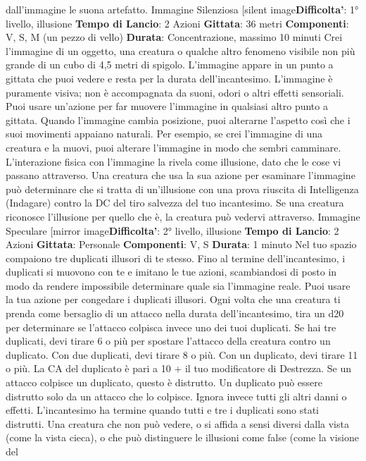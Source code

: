\begin{multicols}{2}
dall’immagine le suona artefatto.
Immagine Silenziosa
[silent image\textbf{Difficolta'}:
1° livello, illusione
\textbf{Tempo di Lancio}: 2 Azioni
\textbf{Gittata}: 36 metri
\textbf{Componenti}: V, S, M (un pezzo di vello)
\textbf{Durata}: Concentrazione, massimo 10 minuti
Crei l’immagine di un oggetto, una creatura o qualche
altro fenomeno visibile non più grande di un cubo di 4,5
metri di spigolo. L’immagine appare in un punto a
gittata che puoi vedere e resta per la durata
dell’incantesimo. L’immagine è puramente visiva; non è
accompagnata da suoni, odori o altri effetti sensoriali.
Puoi usare un’azione per far muovere l’immagine in
qualsiasi altro punto a gittata. Quando l’immagine
cambia posizione, puoi alterarne l’aspetto così che i
suoi movimenti appaiano naturali. Per esempio, se crei
l’immagine di una creatura e la muovi, puoi alterare
l’immagine in modo che sembri camminare.
L’interazione fisica con l’immagine la rivela come
illusione, dato che le cose vi passano attraverso. Una
creatura che usa la sua azione per esaminare
l’immagine può determinare che si tratta di un’illusione
con una prova riuscita di Intelligenza (Indagare) contro
la DC del tiro salvezza del tuo incantesimo. Se una
creatura riconosce l’illusione per quello che è, la
creatura può vedervi attraverso.
Immagine Speculare
[mirror image\textbf{Difficolta'}:
2° livello, illusione
\textbf{Tempo di Lancio}: 2 Azioni
\textbf{Gittata}: Personale
\textbf{Componenti}: V, S
\textbf{Durata}: 1 minuto
Nel tuo spazio compaiono tre duplicati illusori di te
stesso. Fino al termine dell’incantesimo, i duplicati si
muovono con te e imitano le tue azioni, scambiandosi di
posto in modo da rendere impossibile determinare
quale sia l’immagine reale. Puoi usare la tua azione per
congedare i duplicati illusori.
Ogni volta che una creatura ti prenda come bersaglio di
un attacco nella durata dell’incantesimo, tira un d20 per
determinare se l’attacco colpisca invece uno dei tuoi
duplicati.
Se hai tre duplicati, devi tirare 6 o più per spostare
l’attacco della creatura contro un duplicato. Con due
duplicati, devi tirare 8 o più. Con un duplicato, devi
tirare 11 o più.
La CA del duplicato è pari a 10 + il tuo modificatore di
Destrezza. Se un attacco colpisce un duplicato, questo
è distrutto. Un duplicato può essere distrutto solo da un
attacco che lo colpisce. Ignora invece tutti gli altri danni
o effetti. L’incantesimo ha termine quando tutti e tre i
duplicati sono stati distrutti.
Una creatura che non può vedere, o si affida a sensi
diversi dalla vista (come la vista cieca), o che può 
distinguere le illusioni come false (come la visione del

\end{multicols}
